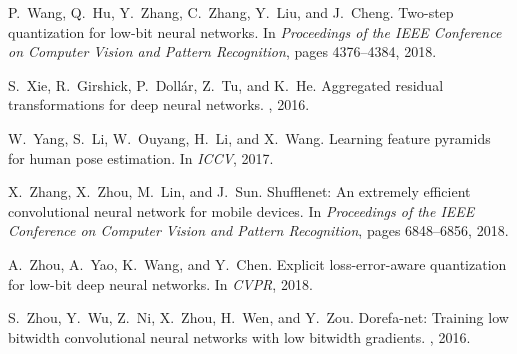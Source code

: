 \documentclass[10pt,twocolumn,letterpaper]{article}
\begin{document}
{\begin{thebibliography}{10}
P.~Wang, Q.~Hu, Y.~Zhang, C.~Zhang, Y.~Liu, and J.~Cheng.
\newblock Two-step quantization for low-bit neural networks.
\newblock In {\em Proceedings of the IEEE Conference on Computer Vision and
  Pattern Recognition}, pages 4376--4384, 2018.

S.~Xie, R.~Girshick, P.~Doll{\'a}r, Z.~Tu, and K.~He.
\newblock Aggregated residual transformations for deep neural networks.
, 2016.

W.~Yang, S.~Li, W.~Ouyang, H.~Li, and X.~Wang.
\newblock Learning feature pyramids for human pose estimation.
\newblock In {\em ICCV}, 2017.

X.~Zhang, X.~Zhou, M.~Lin, and J.~Sun.
\newblock Shufflenet: An extremely efficient convolutional neural network for
  mobile devices.
\newblock In {\em Proceedings of the IEEE Conference on Computer Vision and
  Pattern Recognition}, pages 6848--6856, 2018.

A.~Zhou, A.~Yao, K.~Wang, and Y.~Chen.
\newblock Explicit loss-error-aware quantization for low-bit deep neural
  networks.
\newblock In {\em CVPR}, 2018.

S.~Zhou, Y.~Wu, Z.~Ni, X.~Zhou, H.~Wen, and Y.~Zou.
\newblock Dorefa-net: Training low bitwidth convolutional neural networks with
  low bitwidth gradients.
, 2016.

\end{thebibliography}
 
}
\end{document}
